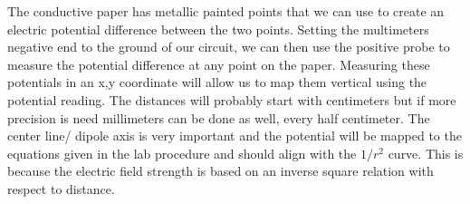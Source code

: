 \documentclass{article}
\begin{document}
    The conductive paper has metallic painted points that we can use to create an electric potential difference between the two points. Setting the multimeters negative end to the ground of our circuit, we can then use the positive probe to measure the potential difference at any point on the paper. Measuring these potentials in an x,y coordinate will allow us to map them vertical using the potential reading. The distances will probably start with centimeters but if more precision is need millimeters can be done as well, every half centimeter. The center line/ dipole axis is very important and the potential will be mapped to the equations given in the lab procedure and should align with the $1/r^2$ curve. This is because the electric field strength is based on an inverse square relation with respect to distance. 
\end{document}

